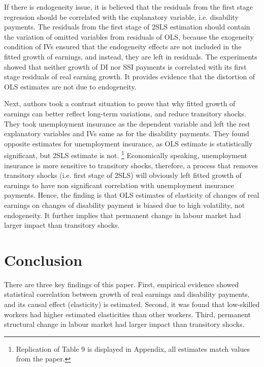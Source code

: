 \documentclass{article} %
\begin{document}
If there is endogeneity issue, it is believed that the residuals from the first stage regression should be correlated with the explanatory variable, i.e. disability payments. The residuals from the first stage of 2SLS estimation should contain the variation of omitted variables from residuals of OLS, because the exogeneity condition of IVs ensured that the endogeneity effects are not included in the fitted growth of earnings, and instead, they are left in residuals. The experiments showed that neither growth of DI nor SSI payments is correlated with its first stage residuals of real earning growth. It provides evidence that the distortion of OLS estimates are not due to endogeneity.

Next, authors took a contrast situation to prove that why fitted growth of earnings can better reflect long-term variations, and reduce transitory shocks. They took unemployment insurance as the dependent variable and left the rest explanatory variables and IVs same as for the disability payments. They found opposite estimates for unemployment insurance, as OLS estimate is statistically significant, but 2SLS estimate is not.
\footnote{Replication of Table 9 is displayed in Appendix, all estimates match values from the paper.}
Economically speaking, unemployment insurance is more sensitive to transitory shocks, therefore, a process that removes transitory shocks (i.e. first stage of 2SLS) will obviously left fitted growth of earnings to have non significant correlation with unemployment insurance payments. Hence, the finding is that OLS estimates of elasticity of changes of real earnings on changes of disability payment is biased due to high volatility, not endogeneity. It further implies that permanent change in labour market had larger impact than transitory shocks. 

\section{Conclusion}
There are three key findings of this paper. First, empirical evidence showed statistical correlation between growth of real earnings and disability payments, and its causal effect (elasticity) is estimated. Second, it was found that low-skilled workers had higher estimated elasticities than other workers. Third, permanent structural change in labour market had larger impact than transitory shocks.
\end{document}
